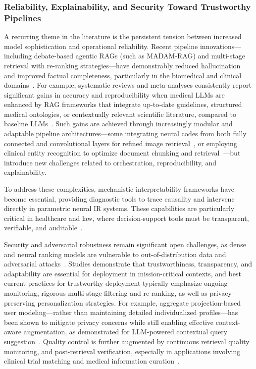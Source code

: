 \documentclass[sigconf]{acmart}
\begin{document}
\subsubsection{Reliability, Explainability, and Security Toward Trustworthy Pipelines}

A recurring theme in the literature is the persistent tension between increased model sophistication and operational reliability. Recent pipeline innovations—including debate-based agentic RAGs (such as MADAM-RAG) and multi-stage retrieval with re-ranking strategies—have demonstrably reduced hallucination and improved factual completeness, particularly in the biomedical and clinical domains~\cite{ref2,ref3,ref5,ref21,ref28,ref39,ref46,ref50,ref55,ref61}. For example, systematic reviews and meta-analyses consistently report significant gains in accuracy and reproducibility when medical LLMs are enhanced by RAG frameworks that integrate up-to-date guidelines, structured medical ontologies, or contextually relevant scientific literature, compared to baseline LLMs~\cite{ref2,ref3,ref5,ref21,ref48,ref53,ref55,ref54}. Such gains are achieved through increasingly modular and adaptable pipeline architectures—some integrating neural codes from both fully connected and convolutional layers for refined image retrieval~\cite{ref21}, or employing clinical entity recognition to optimize document chunking and retrieval~\cite{ref3}—but introduce new challenges related to orchestration, reproducibility, and explainability.

To address these complexities, mechanistic interpretability frameworks have become essential, providing diagnostic tools to trace causality and intervene directly in parametric neural IR systems. These capabilities are particularly critical in healthcare and law, where decision-support tools must be transparent, verifiable, and auditable~\cite{ref33,ref34,ref53,ref5,ref2}.

Security and adversarial robustness remain significant open challenges, as dense and neural ranking models are vulnerable to out-of-distribution data and adversarial attacks~\cite{ref2,ref7,ref37,ref49,ref51,ref55,ref61,ref62}. Studies demonstrate that trustworthiness, transparency, and adaptability are essential for deployment in mission-critical contexts, and best current practices for trustworthy deployment typically emphasize ongoing monitoring, rigorous multi-stage filtering and re-ranking, as well as privacy-preserving personalization strategies. For example, aggregate projection-based user modeling—rather than maintaining detailed individualized profiles—has been shown to mitigate privacy concerns while still enabling effective context-aware augmentation, as demonstrated for LLM-powered contextual query suggestion~\cite{ref36}. Quality control is further augmented by continuous retrieval quality monitoring, and post-retrieval verification, especially in applications involving clinical trial matching and medical information curation~\cite{ref48,ref53}.
\end{document}
